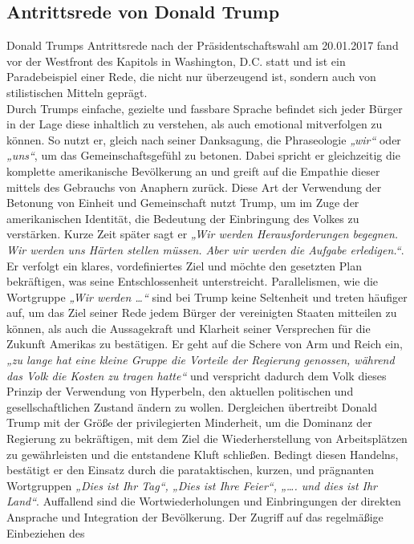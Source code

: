 \subsection{Antrittsrede von Donald Trump} 
\label{sec: Antrittsrede von Donald Trump}
Donald Trumps Antrittsrede nach der Präsidentschaftswahl am 20.01.2017 fand vor der Westfront des Kapitols in Washington, D.C. statt und 
ist ein Paradebeispiel einer Rede, die nicht nur überzeugend ist, 
sondern auch von stilistischen Mitteln geprägt. \\Durch Trumps einfache, gezielte und fassbare Sprache 
befindet sich jeder Bürger in der Lage diese inhaltlich zu verstehen, als auch emotional mitverfolgen 
zu können. So nutzt er, gleich nach seiner Danksagung, die Phraseologie \textit{„wir“} oder \textit{„uns“}, um das 
Gemeinschaftsgefühl zu betonen. Dabei spricht er gleichzeitig die komplette amerikanische Bevölkerung 
an und greift auf die Empathie dieser mittels des Gebrauchs von Anaphern zurück. Diese Art der 
Verwendung der Betonung von Einheit und Gemeinschaft nutzt Trump, um im Zuge der amerikanischen 
Identität, die Bedeutung der Einbringung des Volkes zu verstärken. Kurze Zeit später sagt er 
\textit{„Wir werden Herausforderungen begegnen. Wir werden uns Härten stellen müssen. Aber wir werden die 
Aufgabe erledigen.“}. Er verfolgt ein klares, vordefiniertes Ziel und möchte den gesetzten Plan 
bekräftigen, was seine Entschlossenheit unterstreicht. Parallelismen, wie die Wortgruppe 
\textit{„Wir werden …“} sind bei Trump keine Seltenheit und treten häufiger auf, um das Ziel seiner Rede 
jedem Bürger der vereinigten Staaten mitteilen zu können, als auch die Aussagekraft und Klarheit 
seiner Versprechen für die Zukunft Amerikas zu bestätigen. Er geht auf die Schere von Arm und Reich 
ein, \textit{„zu lange hat eine kleine Gruppe die Vorteile der Regierung genossen, während das Volk die 
Kosten zu tragen hatte“} und verspricht dadurch dem Volk dieses Prinzip der Verwendung von Hyperbeln, 
den aktuellen politischen und gesellschaftlichen Zustand ändern zu wollen. Dergleichen übertreibt 
Donald Trump mit der Größe der privilegierten Minderheit, um die Dominanz der Regierung zu 
bekräftigen, mit dem Ziel die Wiederherstellung von Arbeitsplätzen zu gewährleisten und die 
entstandene Kluft schließen. Bedingt diesen Handelns, bestätigt er den Einsatz durch die 
parataktischen, kurzen, und prägnanten Wortgruppen \textit{„Dies ist Ihr Tag“, „Dies ist Ihre Feier“, 
„…. und dies ist Ihr Land“}. Auffallend sind die Wortwiederholungen und Einbringungen der direkten 
Ansprache und Integration der Bevölkerung. Der Zugriff auf das regelmäßige Einbeziehen des 
